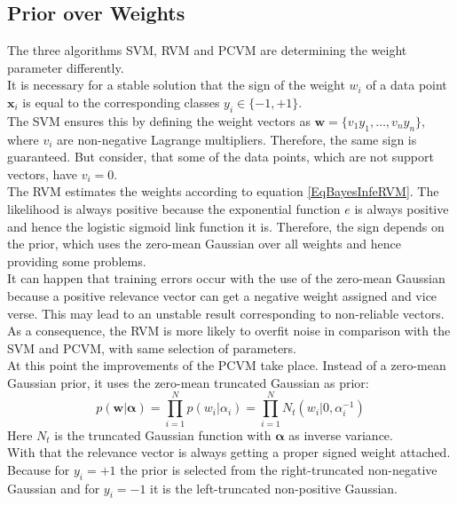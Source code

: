 \subsection{Prior over Weights}\label{PcSecWeights}
The three algorithms \acs{SVM}, \acs{RVM} and \acs{PCVM} are determining the weight parameter differently.\\
It is necessary for a stable solution that the sign of the weight $w_i$ of a data point $\mathbf{x}_i$ is equal to the corresponding classes $y_i \in\{-1,+1\}$.\cite{Chen.2009}\\
The \ac{SVM} ensures this by defining the weight vectors as $\mathbf{w} = \{v_1y_1,\dots,v_ny_n\}$, where $v_i$ are non-negative Lagrange multipliers.
Therefore, the same sign is guaranteed.\cite{Chen.2009}
But consider, that some of the data points, which are not support vectors, have $v_i=0$.\cite[p. 330]{Bishop.2009} \\
The \ac{RVM} estimates the weights according to equation \eqref{EqBayesInfeRVM}.
The likelihood is always positive because the exponential function $e$ is always positive \cite[p. 355]{Hartmann.2015} and hence the logistic sigmoid link function it is.
Therefore, the sign depends on the prior, which uses the zero-mean Gaussian over all weights and hence providing some problems.\\
It can happen that training errors occur with the use of the zero-mean Gaussian because a positive relevance vector can get a negative weight assigned and vice verse.
This may lead to an unstable result corresponding to non-reliable vectors.
As a consequence, the \acs{RVM} is more likely to overfit noise in comparison with the \acs{SVM} and \acs{PCVM}, with same selection of parameters.\cite{Chen.2009}\\
At this point the improvements of the \acs{PCVM} take place. 
Instead of a zero-mean Gaussian prior, it uses the zero-mean truncated Gaussian as prior:\cite{Chen.2009}
\begin{equation}\label{EqPcvmNtPrior}
p(\mathbf{w} \vert \boldsymbol{\alpha}) = \prod_{i=1}^{N}p(w_i \vert \alpha_i) = \prod_{i=1}^{N}N_t(w_i \vert 0,\alpha_i^{-1})
\end{equation}
Here $N_t$ is the truncated Gaussian function with $\boldsymbol{\alpha}$ as inverse variance.\\
With that the relevance vector is always getting a proper signed weight attached.
Because for $y_i=+1$ the prior is selected from the right-truncated non-negative Gaussian and for $y_i=-1$ it is the left-truncated non-positive Gaussian.\cite{Chen.2009}\\
